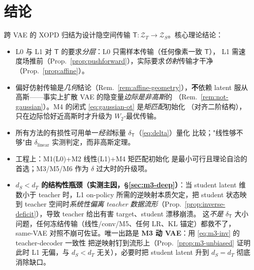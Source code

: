 \documentclass[11pt,a4paper]{article}
\newcommand{\Zt}{\mathcal{Z}_T}
\newcommand{\Zs}{\mathcal{Z}_S}
\newcommand{\Tmap}{\mathsf{T}}
\theoremstyle{definition}
\begin{document}
\section{结论}

跨 VAE 的 XOPD 归结为设计隐空间传输 $\Tmap:\Zt\to\Zs$。核心理论结论：
\begin{itemize}[leftmargin=1.4em]
\item L0 与 L1 对 $\Tmap$ 的要求\emph{分层}：L0 只需样本传输（任何像素一致 $\Tmap$），
L1 需速度场推前（Prop.~\ref{prop:pushforward}），实际要求\emph{仿射}传输才干净
（Prop.~\ref{prop:affine}）。
\item 偏好仿射传输是\emph{几何}结论（Rem.~\ref{rem:affine-geometry}），\textbf{不}依赖
latent 服从高斯——事实上扩散 VAE 的隐变量\emph{边际是非高斯}的
（Rem.~\ref{rem:not-gaussian}）。M4 的闭式 \eqref{eq:gaussian-ot} 是\emph{矩匹配}初始化
（对齐二阶结构），只在边际恰好近高斯时才升级为 $W_2$-最优传输。
\item 所有方法的有损性可用单一\emph{经验}标量 $\delta_{\Tmap}$（\eqref{eq:delta}）量化
比较；"线性够不够"由 $\delta_{\mathrm{linear}}$ 实测判定，而非高斯定理。
\item 工程上：M1(L0)+M2 线性(L1)+M4 矩匹配初始化 是最小可行且理论自洽的首选；M3/M5/M6
作为 $\delta$ 过大时的升级项。
\item \textbf{$d_S<d_T$ 的结构性瓶颈（实测主因，§\ref{sec:m3-deep}）}：当 student latent 维数小于
teacher 时，L1 on-policy 所需的逆映射本质欠定，把 student 状态映到 teacher 空间时\emph{系统性偏离
teacher 数据流形}（Prop.~\ref{prop:inverse-deficit}），导致 teacher 给出有害 target、student 漂移崩溃。
这\emph{不是} $\delta_{\Tmap}$ 大小问题，任何冻结传输（线性/conv/M5、任何 LR、KL 锚定）都救不了，
same-VAE 对照不崩可佐证。唯一出路是 \textbf{M3 动 VAE}：用 \eqref{eq:m3-inv} 的 teacher-decoder 一致性
把逆映射钉到流形上（Prop.~\ref{prop:m3-unbiased} 证明此时 L1 无偏，与 $d_S<d_T$ 无关），必要时把
student latent 升到 $d_S{=}d_T$ 彻底消除缺口。
\end{itemize}
\end{document}
